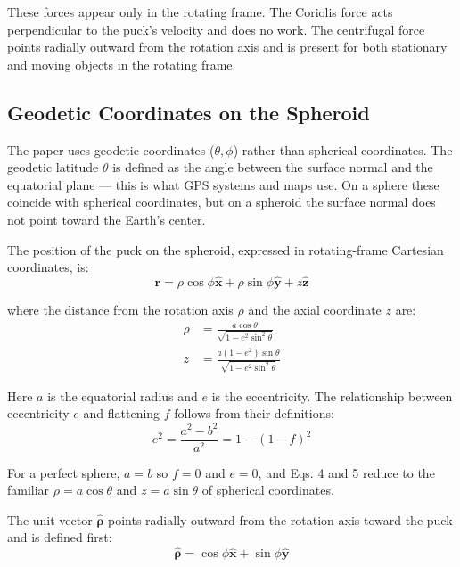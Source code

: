 \documentclass[10pt, a4paper]{article}
\begin{document}
These forces appear only in the rotating frame. The Coriolis force acts perpendicular to the puck’s velocity and does no work. The centrifugal force points radially outward from the rotation axis and is present for both stationary and moving objects in the rotating frame.

\subsection{Geodetic Coordinates on the Spheroid}
The paper uses geodetic coordinates ($\theta, \phi$) rather than spherical coordinates. The geodetic latitude $\theta$ is defined as the angle between the surface normal and the equatorial plane — this is what GPS systems and maps use. On a sphere these coincide with spherical coordinates, but on a spheroid the surface normal does not point toward the Earth’s center.

The position of the puck on the spheroid, expressed in rotating-frame Cartesian coordinates, is:
\begin{equation}
\mathbf{r} = \rho \cos\phi \hat{\mathbf{x}} + \rho \sin\phi \hat{\mathbf{y}} + z\hat{\mathbf{z}} \label{eq:3}
\end{equation}

where the distance from the rotation axis $\rho$ and the axial coordinate $z$ are:
\begin{align}
\rho &= \frac{a \cos\theta}{\sqrt{1 - e^2 \sin^2\theta}} \label{eq:4} \\
z &= \frac{a (1 - e^2) \sin\theta}{\sqrt{1 - e^2 \sin^2\theta}} \label{eq:5}
\end{align}

Here $a$ is the equatorial radius and $e$ is the eccentricity. The relationship between eccentricity $e$ and flattening $f$ follows from their definitions:
\begin{equation}
e^2 = \frac{a^2 - b^2}{a^2} = 1 - (1 - f)^2 \label{eq:7}
\end{equation}

For a perfect sphere, $a = b$ so $f = 0$ and $e = 0$, and Eqs. 4 and 5 reduce to the familiar $\rho = a \cos\theta$ and $z = a \sin\theta$ of spherical coordinates.

The unit vector $\hat{\boldsymbol{\rho}}$ points radially outward from the rotation axis toward the puck and is defined first:
\begin{equation}
\hat{\boldsymbol{\rho}} = \cos\phi \hat{\mathbf{x}} + \sin\phi \hat{\mathbf{y}} \label{eq:8a}
\end{equation}
\end{document}
